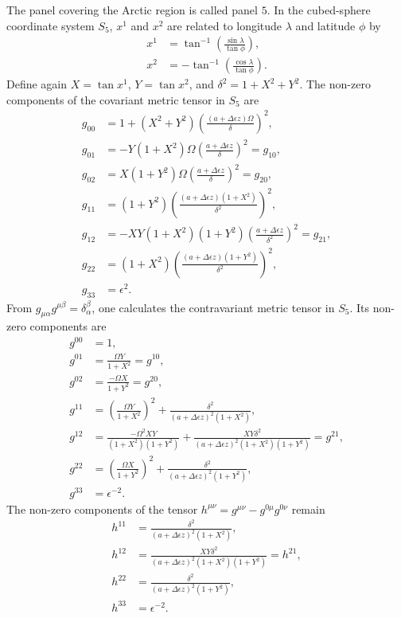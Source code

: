 \documentclass{article}
\begin{document}
The panel covering the Arctic region is called panel $5$. In the cubed-sphere coordinate system $S_5$, $x^1$ and $x^2$ are related to longitude $\lambda$ and latitude $\phi$ by
\begin{align}
x^1&=\tan^{-1} \left( \frac{\sin \lambda}{\tan \phi}  \right), \\
x^2&=- \tan^{-1} \left( \frac{\cos \lambda}{\tan \phi}  \right).
\end{align}
Define again $X=\tan x^1$, $Y=\tan x^2$, and $\delta^2=1+X^2+Y^2$. The non-zero components of the covariant metric tensor in $S_5$ are
\begin{align}
g_{00}&=1+(X^2+Y^2) \left( \frac{(a+\Delta\epsilon z)\Omega}{\delta} \right)^2, \\
g_{01}&=-Y(1+X^2) \Omega \left( \frac{a+\Delta\epsilon z}{\delta} \right)^2=g_{10}, \\
g_{02}&=X(1+Y^2) \Omega \left( \frac{a+\Delta\epsilon z}{\delta} \right)^2=g_{20}, \\
g_{11}&=(1+Y^2) \left( \frac{(a+\Delta\epsilon z)(1+X^2)}{\delta^2} \right)^2, \\
g_{12}&=-XY(1+X^2)(1+Y^2) \left( \frac{a+\Delta\epsilon z}{\delta^2} \right)^2=g_{21}, \\
g_{22}&=(1+X^2) \left( \frac{(a+\Delta\epsilon z)(1+Y^2)}{\delta^2} \right)^2, \\
g_{33}&=\epsilon^2.
\end{align}
From $g_{\mu \alpha}g^{\mu \beta}=\delta^\beta_\alpha$, one calculates the contravariant metric tensor in $S_5$. Its non-zero components are
\begin{align}
g^{00}&=1, \\
g^{01}&=\frac{\Omega Y}{1+X^2}=g^{10}, \\
g^{02}&=\frac{-\Omega X}{1+Y^2} = g^{20}, \\
g^{11}&=\left( \frac{\Omega Y}{1+X^2}\right)^2+  \frac{\delta^2}{(a+\Delta \epsilon z)^2(1+X^2)}, \\
g^{12}&=\frac{-\Omega^2 XY}{(1+X^2)(1+Y^2)}+\frac{XY\delta^2}{(a+\Delta \epsilon z)^2(1+X^2)(1+Y^2)}=g^{21}, \\
g^{22}&=\left( \frac{\Omega X}{1+Y^2} \right)^2+\frac{\delta^2}{(a+\Delta \epsilon z)^2(1+Y^2)}, \\
g^{33}&=\epsilon^{-2}.
\end{align}
The non-zero components of the tensor $h^{\mu \nu}=g^{\mu \nu}-g^{0 \mu}g^{0 \nu}$ remain
\begin{align}
h^{11}&=\frac{\delta^2}{(a+\Delta \epsilon z)^2(1+X^2)}, \\
h^{12}&=\frac{XY\delta^2}{(a+\Delta \epsilon z)^2(1+X^2)(1+Y^2)}=h^{21}, \\
h^{22}&=\frac{\delta^2}{(a+\Delta \epsilon z)^2(1+Y^2)}, \\
h^{33}&=\epsilon^{-2}.
\end{align}
\end{document}
